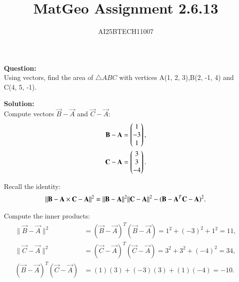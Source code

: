 \documentclass[journal]{IEEEtran}
\begin{document}

\vspace{3cm}

\title{MatGeo Assignment 2.6.13}
\author{AI25BTECH11007}
 \maketitle
{\let\newpage\relax\maketitle}

\renewcommand{\thefigure}{\theenumi}
\renewcommand{\thetable}{\theenumi}
\setlength{\intextsep}{10pt} %


\renewcommand{\thetable}{\theenumi}
\textbf{Question:}\\
Using vectors, find the area of $\triangle ABC$ with vertices A(1, 2, 3),B(2, -1, 4) and C(4, 5, -1).

\textbf{Solution:}\\
 Compute vectors $\vec{B}-\vec{A}$ and $\vec{C}-\vec{A}$:\\
 
\begin{align}
\vec{B}-\vec{A} = \myvec{1\\-3\\1}, \label{eq:AB}\\
\vec{C}-\vec{A} = \myvec{3\\3\\-4}. \label{eq:AC}
\end{align}

Recall the identity:
\begin{equation}
\|\vec{B}-\vec{A}\\ \times \vec{C}-\vec{A}\|^2
= \|\vec{B}-\vec{A}\|^2 \|\vec{C}-\vec{A}\|^2 - (\vec{B}-\vec{A}^T\vec{C}-\vec{A})^2. \label{eq:identity}
\end{equation}

Compute the inner products:
\begin{align}
\|\vec{B}-\vec{A}\|^2 &= (\vec{B}-\vec{A})^T (\vec{B}-\vec{A}) = 1^2 + (-3)^2 + 1^2 = 11, \label{eq:ABsq}\\
\|\vec{C}-\vec{A}\|^2 &= (\vec{C}-\vec{A})^T (\vec{C}-\vec{A}) = 3^2 + 3^2 + (-4)^2 = 34, \label{eq:ACsq}\\
(\vec{B}-\vec{A})^T(\vec{C}-\vec{A}) &= (1)(3) + (-3)(3) + (1)(-4) = -10. \label{eq:dot}
\end{align}
\end{document}
